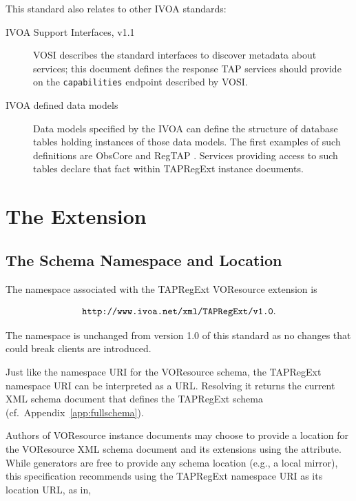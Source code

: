 \documentclass{ivoa}
\begin{document}
This standard also relates to other IVOA standards:


\begin{description}
\item[IVOA Support Interfaces, v1.1 \citep{2017ivoa.spec.0524G}] \hfil\break VOSI describes the standard interfaces to discover metadata about
services; this document defines the response TAP services should
provide on the \texttt{capabilities} endpoint described by VOSI.
\item[IVOA defined data models]Data models specified by the IVOA can define the structure of
database tables holding instances of those data models.
The first examples of such definitions are ObsCore
\citep{2017ivoa.spec.0509L} and RegTAP \citep{2019ivoa.spec.1011D}.  Services providing
access to such tables
declare that fact within TAPRegExt instance documents.

\end{description}


\section{The Extension}

\label{taextension}

\subsection{The Schema Namespace and Location}

\label{nsloc}

The namespace associated with the TAPRegExt VOResource extension is

$$
\mbox{\texttt{http://www.ivoa.net/xml/TAPRegExt/v1.0}.}
$$

The namespace is unchanged from version 1.0 of this standard as no
changes that could break clients are introduced.

Just like the namespace URI for the VOResource schema, the
TAPRegExt namespace URI can be interpreted as a URL.  Resolving it
returns the current XML schema document
that defines the TAPRegExt schema (cf.~Appendix~\ref{app:fullschema}).

Authors of VOResource instance documents may choose to
provide a location for the VOResource XML schema document and its
extensions using the
 attribute.
While generators are
free to provide any schema location (e.g., a local mirror), this specification
recommends using the TAPRegExt namespace URI as its location URL,
as in,
\end{document}
